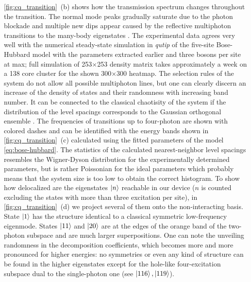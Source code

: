 \documentclass[%
 aps, prl,
 amsmath,amssymb,
 reprint,%
superscriptaddress
]{revtex4-2}
\begin{document}
\autoref{fig:cq_transition}~(b) shows how the transmission spectrum changes throughout the transition. The normal mode peaks gradually saturate due to the photon blockade and multiple new dips appear caused by the reflective multiphoton transitions to the many-body eigenstates \cite{Biella2015,PhysRevA.102.013707,roberts2020driven}. The experimental data agrees very well with the numerical steady-state simulation in \textit{qutip} \cite{qutip1, qutip2} of the five-site Bose-Hubbard model with the parameters extracted earlier and three bosons per site at max; full simulation of 253$\times$253 density matrix takes approximately a week on a 138 core cluster for the shown 300$\times$300 heatmap. The selection rules of the system do not allow all possible multiphoton lines, but one can clearly discern an increase of the density of states and their randomness with increasing band number. It can be connected to the classical chaotisity of the system if the distribution of the level spacings corresponds to the Gaussian orthogonal ensemble \cite{bohigas1984characterization,zimmermann1986manifestation,kolovsky2004quantum, livan2018introduction}. The frequencies of transitions up to four-photon are shown with colored dashes and can be identified with the energy bands shown in \autoref{fig:cq_transition}~(c) calculated using the fitted parameters of the model \autoref{eq:bose-hubbard}. The statistics of the calculated nearest-neighbor level spacings resembles the Wigner-Dyson distribution for the experimentally determined parameters, but is rather Poissonian for the ideal parameters which probably means that the system size is too low to obtain the correct histogram. To show how delocalized are the eigenstates $ \ket{n} $ reachable in our device ($n$ is counted excluding the states with more than three excitation per site), in \autoref{fig:cq_transition}~(d) we project several of them onto the non-interacting basis. State $\ket{1}$ has the structure identical to a classical symmetric low-frequency eigenmode. States $\ket{11}$ and $\ket{20}$ are at the edges of the orange band of the two-photon subspace and are much larger superpositions. One can note the unveiling randomness in the decomposition coefficients, which becomes more and more pronounced for higher energies: no symmetries or even any kind of structure can be found in the higher eigenstates except for the hole-like four-excitation subspace dual to the single-photon one (see $\ket{116}, \ket{119}$). 
\end{document}
